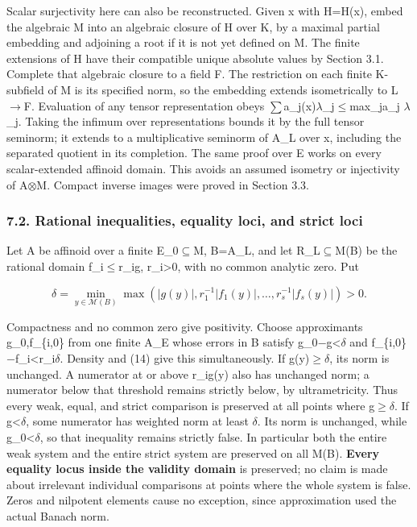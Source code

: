 \documentclass[
  10pt,
]{article}
\begin{document}
Scalar surjectivity here can also be reconstructed. Given x with H=H(x),
embed the algebraic M into an algebraic closure of H over K, by a
maximal partial embedding and adjoining a root if it is not yet defined
on M. The finite extensions of H have their compatible unique absolute
values by Section 3.1. Complete that algebraic closure to a field F. The
restriction on each finite K-subfield of M is its specified norm, so the
embedding extends isometrically to L\ensuremath{\to}F. Evaluation of any tensor
representation obeys
\textbar\ensuremath{\sum}a\_j(x)\ensuremath{\lambda}\_j\textbar\ensuremath{\le}max\_j\textbar\textbar a\_j\textbar\textbar{}
\textbar \ensuremath{\lambda}\_j\textbar. Taking the infimum over representations bounds it
by the full tensor seminorm; it extends to a multiplicative seminorm of
A\_L over x, including the separated quotient in its completion. The
same proof over E works on every scalar-extended affinoid domain. This
avoids an assumed isometry or injectivity of A\ensuremath{\otimes}M. Compact inverse images
were proved in Section 3.3.

\subsubsection{7.2. Rational inequalities, equality loci, and strict
loci}\label{rational-inequalities-equality-loci-and-strict-loci}

Let A be affinoid over a finite E\_0\ensuremath{\subseteq}M, B=A\_L, and let R\_L\ensuremath{\subseteq}M(B) be the
rational domain \textbar f\_i\textbar\ensuremath{\le}r\_i\textbar g\textbar,
r\_i\textgreater0, with no common analytic zero. Put

\[
 \delta=\min_{y\in\mathcal{M}(B)}
    \max(|g(y)|,r_1^{-1}|f_1(y)|,\ldots,r_s^{-1}|f_s(y)|)>0. \tag{15}
\]

Compactness and no common zero give positivity. Choose approximants
g\_0,f\_\{i,0\} from one finite A\_E whose errors in B satisfy
\textbar\textbar g\_0\ensuremath{-}g\textbar\textbar\textless \ensuremath{\delta} and
\textbar\textbar f\_\{i,0\}\ensuremath{-}f\_i\textbar\textbar\textless r\_i\ensuremath{\delta}. Density
and (14) give this simultaneously. If \textbar g(y)\textbar\ensuremath{\ge}\ensuremath{\delta}, its norm
is unchanged. A numerator at or above r\_i\textbar g(y)\textbar{} also
has unchanged norm; a numerator below that threshold remains strictly
below, by ultrametricity. Thus every weak, equal, and strict comparison
is preserved at all points where \textbar g\textbar\ensuremath{\ge}\ensuremath{\delta}. If
\textbar g\textbar\textless \ensuremath{\delta}, some numerator has weighted norm at least
\ensuremath{\delta}. Its norm is unchanged, while \textbar g\_0\textbar\textless \ensuremath{\delta}, so
that inequality remains strictly false. In particular both the entire
weak system and the entire strict system are preserved on all M(B).
\textbf{Every equality locus inside the validity domain} is preserved;
no claim is made about irrelevant individual comparisons at points where
the whole system is false. Zeros and nilpotent elements cause no
exception, since approximation used the actual Banach norm.
\end{document}
